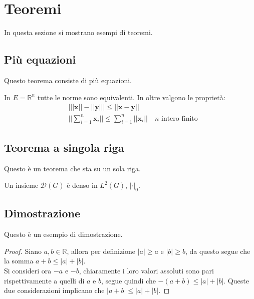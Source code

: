\section{Teoremi}

In questa sezione si mostrano esempi di teoremi.

\subsection{Più equazioni}
Questo teorema consiste di più equazioni.

\begin{theorem}
In $E=\mathbb{R}^n$ tutte le norme sono equivalenti. In oltre valgono le proprietà:
\begin{align}
& \big| ||\mathbf{x}|| - ||\mathbf{y}|| \big|\leq || \mathbf{x}- \mathbf{y}||\\
&  ||\sum_{i=1}^n\mathbf{x}_i||\leq \sum_{i=1}^n||\mathbf{x}_i||\quad\text{$n$ intero finito}
\end{align}
\end{theorem}

\subsection{Teorema a singola riga}
Questo è un teorema che sta su un sola riga.

\begin{theorem}
Un insieme $\mathcal{D}(G)$ è denso in $L^2(G)$, $|\cdot|_0$. 
\end{theorem}

\subsection{Dimostrazione}

Questo è un esempio di dimostrazione.
\begin{proof}
    Siano $a,b\in\mathbb{R}$, allora per definizione $|a|\geq a$ e $|b|\geq b$, da questo segue che la somma $a+b\leq|a|+|b|$.\\
    Si consideri ora $-a$ e $-b$, chiaramente i loro valori assoluti sono pari rispettivamente a quelli di $a$ e $b$, segue quindi che $-(a+b)\leq|a|+|b|$. Queste due considerazioni implicano che $|a+b|\leq|a|+|b|$.
\end{proof}



